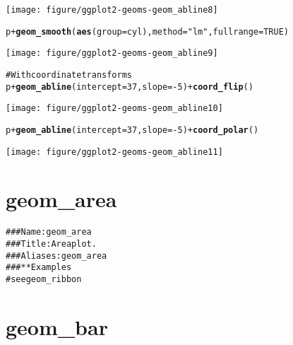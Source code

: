 \documentclass[a4paper,titlepage]{tufte-handout}\usepackage{graphicx, color}
\makeatletter
\def\maxwidth{ %
  \ifdim\Gin@nat@width>\linewidth
    \linewidth
  \else
    \Gin@nat@width
  \fi
}
\newcommand{\hlfunctioncall}[1]{\textcolor[rgb]{0.501960784313725,0,0.329411764705882}{\textbf{#1}}}%
\newcommand{\hlstring}[1]{\textcolor[rgb]{0.6,0.6,1}{#1}}%
\newcommand{\hlcomment}[1]{\textcolor[rgb]{0.180392156862745,0.6,0.341176470588235}{#1}}%
\newenvironment{kframe}{%
 \def\at@end@of@kframe{}%
 \ifinner\ifhmode%
  \def\at@end@of@kframe{\end{minipage}}%
  \begin{minipage}{\columnwidth}%
 \fi\fi%
 \def\FrameCommand##1{\hskip\@totalleftmargin \hskip-\fboxsep
 \colorbox{shadecolor}{##1}\hskip-\fboxsep
     \hskip-\linewidth \hskip-\@totalleftmargin \hskip\columnwidth}%
 \MakeFramed {\advance\hsize-\width
   \@totalleftmargin\z@ \linewidth\hsize
   \@setminipage}}%
 {\par\unskip\endMakeFramed%
 \at@end@of@kframe}
\newenvironment{knitrout}{}{} %
\makeatother
\begin{document}
\begin{knitrout}
\begin{kframe}
\end{kframe}\texttt{[image: figure/ggplot2-geoms-geom\_abline8]} \begin{kframe}\begin{alltt}
p + \hlfunctioncall{geom_smooth}(\hlfunctioncall{aes}(group=cyl), method=\hlstring{"lm"}, fullrange=TRUE)
\end{alltt}
\end{kframe}\texttt{[image: figure/ggplot2-geoms-geom\_abline9]} \begin{kframe}\begin{alltt}
\hlcomment{# With coordinate transforms}
p + \hlfunctioncall{geom_abline}(intercept = 37, slope = -5) + \hlfunctioncall{coord_flip}()
\end{alltt}
\end{kframe}\texttt{[image: figure/ggplot2-geoms-geom\_abline10]} \begin{kframe}\begin{alltt}
p + \hlfunctioncall{geom_abline}(intercept = 37, slope = -5) + \hlfunctioncall{coord_polar}()
\end{alltt}
\end{kframe}\texttt{[image: figure/ggplot2-geoms-geom\_abline11]} 
\end{knitrout}


\section{geom\_area}

\begin{knitrout}
\color{fgcolor}\begin{kframe}
\begin{alltt}
\hlcomment{### Name: geom_area}
\hlcomment{### Title: Area plot.}
\hlcomment{### Aliases: geom_area}
\hlcomment{### ** Examples}
\hlcomment{# see geom_ribbon}
\end{alltt}
\end{kframe}
\end{knitrout}


\section{geom\_bar}
\end{document}
